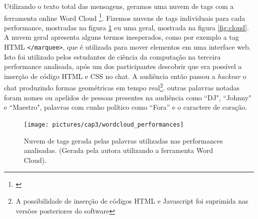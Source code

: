 Utilizando o texto total das mensagens, geramos uma nuvem de tags com a ferramenta online Word Cloud \footnote{\cite{JasonDavies}}. Fizemos nuvens de tags individuais para cada performance, mostradas na figura \ref{fig:clouds} eu uma geral, mostrada na figura \ref{fig:cloud}. A nuvem geral apresenta alguns termos inesperados, como por exemplo a tag HTML \texttt{</marquee>}, que é utilizada para mover elementos em uma interface web. Isto foi utilizado pelos estudantes de ciência da computação na terceira performance analisada, após um dos participantes descobrir que era possível a inserção de código HTML e CSS no chat. A audiência então passou a \emph{hackear} o chat produzindo formas geométricas em tempo real\footnote{A possibilidade de inserção de códigos HTML e Javascript foi suprimida nas versões posteriores do software}. outras palavras notadas foram nomes ou apelidos de pessoas presentes na audiência como ``DJ", ``Johnny" e ``Maestro", palavras com cunho político como ``Fora'' e o caractere de coração. 



\begin{figure}[ht!]

\texttt{[image: pictures/cap3/wordcloud\_performances]}
\caption{Nuvem de tags gerada pelas palavras utilizadas nas performances analisadas. (Gerada pela autora utilizando a ferramenta Word Cloud).}
\label{fig:clouds}
\end{figure}

